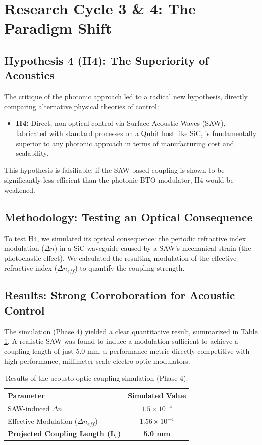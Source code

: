 \documentclass{article}
\begin{document}
\section{Research Cycle 3 \& 4: The Paradigm Shift}
\subsection{Hypothesis 4 (H4): The Superiority of Acoustics}
The critique of the photonic approach led to a radical new hypothesis, directly comparing alternative physical theories of control:
\begin{itemize}
    \item \textbf{H4:} Direct, non-optical control via Surface Acoustic Waves (SAW), fabricated with standard processes on a Qubit host like SiC, is fundamentally superior to any photonic approach in terms of manufacturing cost and scalability.
\end{itemize}
This hypothesis is falsifiable: if the SAW-based coupling is shown to be significantly less efficient than the photonic BTO modulator, H4 would be weakened.

\subsection{Methodology: Testing an Optical Consequence}
To test H4, we simulated its optical consequence: the periodic refractive index modulation ($\Delta n$) in a SiC waveguide caused by a SAW's mechanical strain (the photoelastic effect). We calculated the resulting modulation of the effective refractive index ($\Delta n_{eff}$) to quantify the coupling strength.

\subsection{Results: Strong Corroboration for Acoustic Control}
The simulation (Phase 4) yielded a clear quantitative result, summarized in Table \ref{tab:cycle4}. A realistic SAW was found to induce a modulation sufficient to achieve a coupling length of just 5.0 mm, a performance metric directly competitive with high-performance, millimeter-scale electro-optic modulators.

\begin{table}[H]
\caption{Results of the acousto-optic coupling simulation (Phase 4).}
\label{tab:cycle4}
\centering
\begin{tabular}{lc}
\toprule
\textbf{Parameter} & \textbf{Simulated Value} \\
\midrule
SAW-induced $\Delta n$ & $1.5 \times 10^{-4}$ \\
Effective Modulation ($\Delta n_{eff}$) & $1.56 \times 10^{-4}$ \\
\textbf{Projected Coupling Length (L$_c$)} & \textbf{5.0 mm} \\
\bottomrule
\end{tabular}
\end{table}
\end{document}
